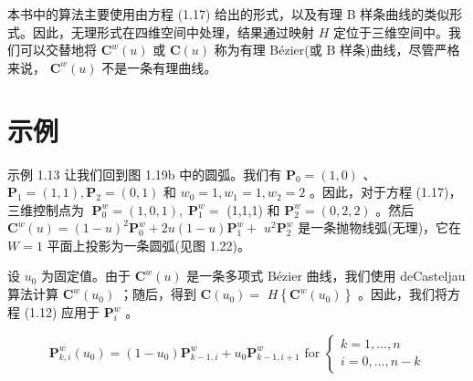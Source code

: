 \documentclass[../main.tex]{subfiles}
\begin{document}
本书中的算法主要使用由方程 (1.17) 给出的形式，以及有理 B 样条曲线的类似形式。因此，无理形式在四维空间中处理，结果通过映射 \(H\) 定位于三维空间中。我们可以交替地将 \({\mathbf{C}}^{w}\left( u\right)\) 或 \(\mathbf{C}\left( u\right)\) 称为有理 Bézier(或 B 样条)曲线，尽管严格来说， \({\mathbf{C}}^{w}\left( u\right)\) 不是一条有理曲线。

\section*{示例}

\noindent\begin{minipage}{\linewidth}
示例 1.13 让我们回到图 1.19b 中的圆弧。我们有 \({\mathbf{P}}_{0} = \left( {1,0}\right)\) 、 \({\mathbf{P}}_{1} = \left( {1,1}\right) ,{\mathbf{P}}_{2} = \left( {0,1}\right)\) 和 \({w}_{0} = 1,{w}_{1} = 1,{w}_{2} = 2\) 。因此，对于方程 (1.17)，三维控制点为 \(\;{\textbf{P}}_{0}^{w} = \left( {1,0,1}\right) ,\;{\textbf{P}}_{1}^{w} =\) (1,1,1) 和 \({\mathbf{P}}_{2}^{w} = \left( {0,2,2}\right)\) 。然后 \({\mathbf{C}}^{w}\left( u\right)  = {\left( 1 - u\right) }^{2}{\mathbf{P}}_{0}^{w} + {2u}\left( {1 - u}\right) {\mathbf{P}}_{1}^{w} +\)  \({u}^{2}{\mathbf{P}}_{2}^{w}\) 是一条抛物线弧(无理)，它在 \(W = 1\) 平面上投影为一条圆弧(见图 1.22)。

\begin{center}
\begin{minipage}{14cm}
\centering
{}
\captionsetup{font=small,skip=6pt,justification=centering}
\end{minipage}
\end{center}
\end{minipage}
\par\medskip

设 \({u}_{0}\) 为固定值。由于 \({\mathbf{C}}^{w}\left( u\right)\) 是一条多项式 Bézier 曲线，我们使用 deCasteljau 算法计算 \({\mathbf{C}}^{w}\left( {u}_{0}\right)\) ；随后，得到 \(\mathbf{C}\left( {u}_{0}\right)  =\)  \(H\left\{  {{\mathbf{C}}^{w}\left( {u}_{0}\right) }\right\}\) 。因此，我们将方程 (1.12) 应用于 \({\mathbf{P}}_{i}^{w}\) 。

\[
{\mathbf{P}}_{k,i}^{w}\left( {u}_{0}\right)  = \left( {1 - {u}_{0}}\right) {\mathbf{P}}_{k - 1,i}^{w} + {u}_{0}{\mathbf{P}}_{k - 1,i + 1}^{w}\text{ for }\left\{  \begin{array}{l} k = 1,\ldots ,n \\  i = 0,\ldots ,n - k \end{array}\right.
\]
\end{document}
